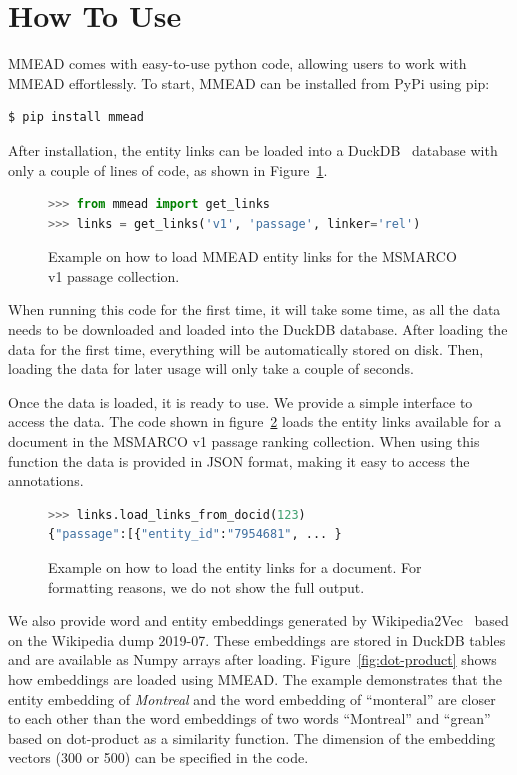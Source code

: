\section{How To Use}
MMEAD comes with easy-to-use python code, allowing users to work with MMEAD effortlessly. To start, MMEAD can be installed from PyPi using pip:
\begin{verbatim}
$ pip install mmead
\end{verbatim}
After installation, the entity links can be loaded into a DuckDB~\citep{duckdb} database with only a couple of lines of code, as shown in Figure~\ref{fig:load-links}.
%
\begin{figure}[!t]
\begin{lstlisting}[language=python]
>>> from mmead import get_links
>>> links = get_links('v1', 'passage', linker='rel')
\end{lstlisting}
\caption{Example on how to load MMEAD entity links for the MSMARCO v1 passage collection.}
\label{fig:load-links}
\end{figure}
%
When running this code for the first time, it will take some time, as all the data needs to be downloaded and loaded into the DuckDB database. After loading the data for the first time, everything will be automatically stored on disk. Then, loading the data for later usage will only take a couple of seconds. 

Once the data is loaded, it is ready to use. We provide a simple interface to access the data. The code shown in figure~\ref{fig:load-links-for-document} loads the entity links available for a document in the MSMARCO v1 passage ranking collection. When using this function the data is provided in JSON format, making it easy to access the annotations.

\begin{figure}[!t]
\begin{lstlisting}[language=python]
>>> links.load_links_from_docid(123)
{"passage":[{"entity_id":"7954681", ... }
\end{lstlisting}
\caption{Example on how to load the entity links for a document. For formatting reasons, we do not show the full output. }
\label{fig:load-links-for-document}
\end{figure}

We also provide word and entity embeddings generated by Wikipedia2Vec~\citep{wikipedia2vec} based on the Wikipedia dump 2019-07. These embeddings are stored in DuckDB tables and are  available as Numpy arrays after loading. Figure~\ref{fig:dot-product} shows how embeddings are loaded using MMEAD. The example demonstrates that the entity embedding of \emph{Montreal} and the word embedding of ``monteral'' are closer to each other than the word embeddings of two words ``Montreal'' and ``grean'' based on dot-product as a similarity function. The dimension of the embedding vectors (300 or 500) can be specified in the code.

